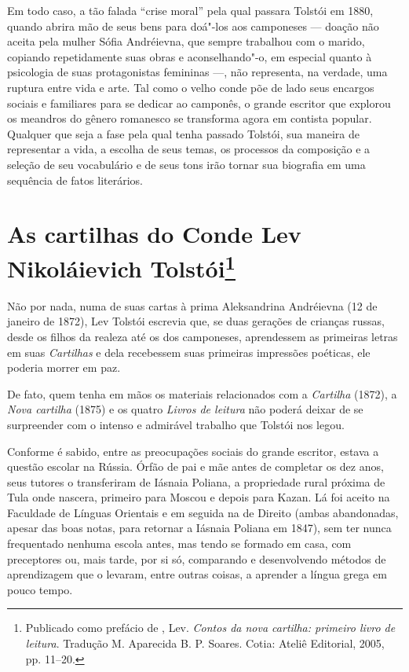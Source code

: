 Em todo caso, a tão falada ``crise moral'' pela qual passara
Tolstói em 1880, quando abrira mão de seus bens para doá"-los
aos camponeses --- doação não aceita pela mulher Sófia Andréievna,
que sempre trabalhou com o marido, copiando repetidamente suas
obras e aconselhando"-o, em especial quanto à psicologia de suas
protagonistas femininas ---, não representa, na verdade, uma
ruptura entre vida e arte. Tal como o velho conde põe de lado
seus encargos sociais e familiares para se dedicar ao camponês,
o grande escritor que explorou os meandros do gênero romanesco
se transforma agora em contista popular. Qualquer que seja a
fase pela qual tenha passado Tolstói, sua maneira de
representar a vida, a escolha de seus temas, os processos da
composição e a seleção de seu vocabulário e de seus tons irão
tornar sua biografia em uma sequência de fatos literários.

\chapter{As cartilhas do Conde Lev Nikoláievich Tolstói\footnote{Publicado como prefácio de {}, Lev. \emph{Contos da nova cartilha: primeiro livro de leitura}. Tradução M. Aparecida B. P. Soares. Cotia: Ateliê Editorial, 2005, pp. 11--20.}}

Não por nada, numa de suas cartas à prima Aleksandrina Andréievna
(12 de janeiro de 1872), Lev Tolstói escrevia que, se
duas gerações de crianças russas, desde os filhos da realeza até
os dos camponeses, aprendessem as primeiras letras em suas
\emph{Cartilhas} e dela recebessem suas primeiras impressões
poéticas, ele poderia morrer em paz.

De fato, quem tenha em mãos os materiais relacionados com
a \emph{Cartilha} (1872), a \emph{Nova cartilha} (1875) e os
quatro \emph{Livros de leitura} não poderá deixar de se
surpreender com o intenso e admirável trabalho que Tolstói nos legou.

Conforme é sabido, entre as preocupações sociais do grande
escritor, estava a questão escolar na Rússia. Órfão de pai e
mãe antes de completar os dez anos, seus tutores o transferiram
de Iásnaia Poliana, a propriedade rural próxima de Tula onde
nascera, primeiro para Moscou e depois para Kazan. Lá foi
aceito na Faculdade de Línguas Orientais e em seguida na de
Direito (ambas abandonadas, apesar das boas notas, para retornar
a Iásnaia Poliana em 1847), sem ter nunca frequentado nenhuma
escola antes, mas tendo se formado em casa, com preceptores ou,
mais tarde, por si só, comparando e desenvolvendo métodos de
aprendizagem que o levaram, entre outras coisas, a aprender a
língua grega em pouco tempo. 

